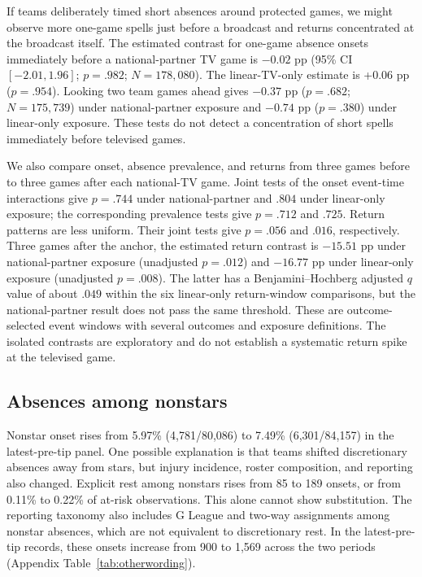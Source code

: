 \documentclass[11pt]{article}
\begin{document}
If teams deliberately timed short absences around protected games, we might observe more one-game spells just before a broadcast and returns concentrated at the broadcast itself. The estimated contrast for one-game absence onsets immediately before a national-partner TV game is $-0.02$ pp (95\% CI $[-2.01,1.96]$; $p=.982$; $N=178{,}080$). The linear-TV-only estimate is +0.06 pp ($p=.954$). Looking two team games ahead gives $-0.37$ pp ($p=.682$; $N=175{,}739$) under national-partner exposure and $-0.74$ pp ($p=.380$) under linear-only exposure. These tests do not detect a concentration of short spells immediately before televised games.

We also compare onset, absence prevalence, and returns from three games before to three games after each national-TV game. Joint tests of the onset event-time interactions give $p=.744$ under national-partner and $.804$ under linear-only exposure; the corresponding prevalence tests give $p=.712$ and $.725$. Return patterns are less uniform. Their joint tests give $p=.056$ and $.016$, respectively. Three games after the anchor, the estimated return contrast is $-15.51$ pp under national-partner exposure (unadjusted $p=.012$) and $-16.77$ pp under linear-only exposure (unadjusted $p=.008$). The latter has a Benjamini--Hochberg adjusted $q$ value of about $.049$ within the six linear-only return-window comparisons, but the national-partner result does not pass the same threshold. These are outcome-selected event windows with several outcomes and exposure definitions. The isolated contrasts are exploratory and do not establish a systematic return spike at the televised game.

\subsection{Absences among nonstars}

Nonstar onset rises from 5.97\% (4,781/80,086) to 7.49\% (6,301/84,157) in the latest-pre-tip panel. One possible explanation is that teams shifted discretionary absences away from stars, but injury incidence, roster composition, and reporting also changed. Explicit rest among nonstars rises from 85 to 189 onsets, or from 0.11\% to 0.22\% of at-risk observations. This alone cannot show substitution. The reporting taxonomy also includes G League and two-way assignments among nonstar absences, which are not equivalent to discretionary rest. In the latest-pre-tip records, these onsets increase from 900 to 1,569 across the two periods (Appendix Table~\ref{tab:otherwording}).
\end{document}
